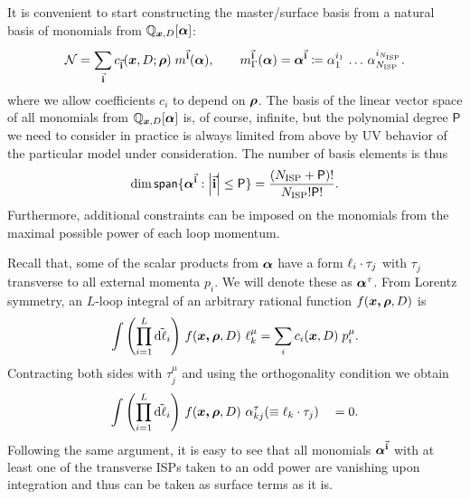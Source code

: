 
It is convenient to start constructing the master/surface basis from a natural basis of monomials from $\mathbb{Q}_{\vb*{x},D}[\vb*{\alpha}]$:
\begin{equation}
  \mathcal{N} = \sum_{\va{i}}^{} c_{\va{i}}(\vb*{x},D;\vb*{\rho}) \; m^{\va{i}}(\vb*{\alpha}), \qquad
  m_\Gamma^{\va{i}}(\vb*{\alpha}) = \vb*{\alpha}^{\va{i}} \coloneqq 
  \alpha_1^{i_1}\,\ldots{}\,\alpha_{N_\text{ISP} }^{i_{N_\text{ISP} }}.
\end{equation}
where we allow coefficients $c_{i}$ to depend on $\vb*{\rho}$.
The basis of the linear vector space of all monomials from $\mathbb{Q}_{\vb*{x},D}[\vb*{\alpha}]$ is, of course, infinite,
but the polynomial degree $\mathsf{P}$ we need to consider in practice is always limited from above by UV behavior of the particular model under consideration.
The number of basis elements is thus
\begin{equation} \label{eq:number_of_monomials}
  \dim{\mathsf{span}\{\vb*{\alpha}^{\va{i}} : \abs{\va{i}} \leq  \mathsf{P}\}} =  \frac{(N_\text{ISP} + \mathsf{P})!}{N_\text{ISP}! \mathsf{P}!}.
\end{equation}
Furthermore, additional constraints can be imposed on the monomials from the maximal possible power of each loop momentum.

Recall that, some of the scalar products from $\vb*{\alpha}$ have a form $\sp(\ell_i,\tau_j)$ with $\tau_j$ transverse to all external momenta $p_i$.
We will denote these as $\vb*{\alpha}^\tau$.
From Lorentz symmetry, an $L$-loop integral of an arbitrary rational function $f(\vb*{\vb*{x},\vb*{\rho}},D)$ is
\begin{equation} \label{eq:rank_1_tensor_integral}
  \int \qty(\prod_{i=1}^{L} \tilde{\dd{\ell_i}}){}~ f(\vb*{\vb*{x},\vb*{\rho}},D) ~ \ell_k^{\mu} = \sum_{i}^{}c_i(\vb*{x},D)\;p^\mu_i.
\end{equation}
Contracting both sides with $\tau^\mu_j$ and using the orthogonality condition we obtain
\begin{equation}
  \Dmeasure{}~ f(\vb*{\vb*{x},\vb*{\rho}},D) ~ \alpha^{\tau}_{k j}( \equiv \sp(\ell_k,\tau_j)) \quad = 0.
\end{equation}
Following the same argument, it is easy to see that all monomials $\vb*{\alpha}^{\va{i}}$ with at least
one of the transverse ISPs taken to an odd power are vanishing upon integration and thus can be taken as surface terms as it is.

